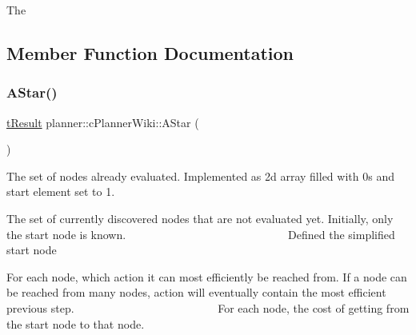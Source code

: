 The 

\subsection{Member Function Documentation}
\mbox{\label{classplanner_1_1c_planner_wiki_aa673ebc2b1b43af3b13fb0c958c5f2e4}} 
\subsubsection{\texorpdfstring{A\+Star()}{AStar()}}
{\footnotesize\ttfamily \mbox{\hyperlink{structt_result}{t\+Result}} planner\+::c\+Planner\+Wiki\+::\+A\+Star (\begin{DoxyParamCaption}{ }\end{DoxyParamCaption})\hspace{0.3cm}{\ttfamily [protected]}}

The set of nodes already evaluated. Implemented as 2d array filled with 0s and start element set to 1.

The set of currently discovered nodes that are not evaluated yet. Initially, only the start node is known. ~\newline
~\newline
~\newline
~\newline
~\newline
~\newline
~\newline
~\newline
~\newline
~\newline
~\newline
~\newline
~\newline
~\newline
~\newline
~\newline
~\newline
 Defined the simplified start node

For each node, which action it can most efficiently be reached from. If a node can be reached from many nodes, action will eventually contain the most efficient previous step. ~\newline
~\newline
~\newline
~\newline
~\newline
~\newline
~\newline
~\newline
~\newline
~\newline
~\newline
~\newline
~\newline
~\newline
~\newline
 For each node, the cost of getting from the start node to that node.

